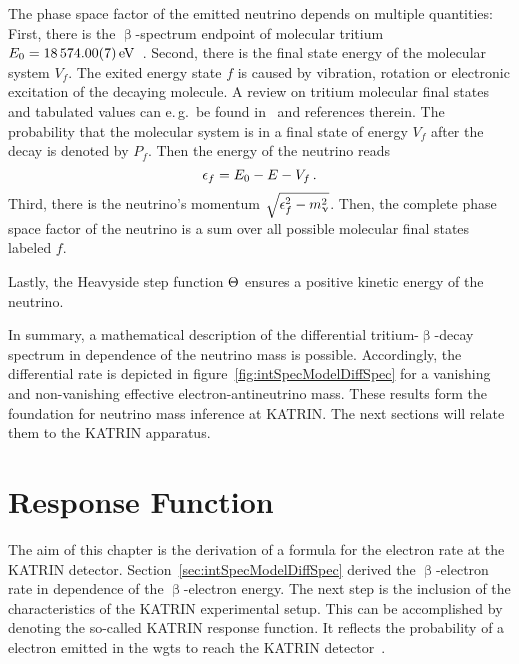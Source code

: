 The phase space factor of the emitted neutrino  depends on multiple quantities: First, there is the $\upbeta$-spectrum endpoint of molecular tritium $E_0=\SI{18574.00\pm0.07}{eV}$~\cite{Myers2015,Otten:2008zz}. Second, there is the final state energy of the molecular system $V_f$. The exited energy state $f$ is caused by vibration, rotation or electronic excitation of the decaying molecule. A review on tritium molecular final states and tabulated values can e.\,g.~be found in~\cite{Bodine2015} and references therein. The probability that the molecular system is in a final state of energy $V_f$ after the decay is denoted by $P_f$. Then the energy of the neutrino reads 
\begin{equation}
\label{eq:intSpecModelDiffSpecNeutrinoEnergy}
\epsilon_f = E_0 - E - V_f 
\text{\,.}
\end{equation}
Third, there is the neutrino's momentum $\sqrt{\epsilon_f^2-m_\upnu^2}$. Then, the complete phase space factor of the neutrino is a sum over all possible molecular final states labeled $f$.

Lastly, the Heavyside step function $\Theta$ ensures a positive kinetic energy of the neutrino.

In summary, a mathematical description of the differential tritium-$\upbeta$-decay spectrum in dependence of the neutrino mass is possible. Accordingly, the differential rate is depicted in figure~\ref{fig:intSpecModelDiffSpec} for a vanishing and non-vanishing effective electron-antineutrino mass. These results form the foundation for neutrino mass inference at KATRIN. The next sections will relate them to the KATRIN apparatus.

\section{Response Function}
\label{sec:intSpecModelResponse}
The aim of this chapter is the derivation of a formula for the electron rate at the KATRIN detector. Section~\ref{sec:intSpecModelDiffSpec} derived the $\upbeta$-electron rate in dependence of the $\upbeta$-electron energy. The next step is the inclusion of the characteristics of the KATRIN experimental setup. This can be accomplished by denoting the so-called KATRIN response function. It reflects the probability of a electron emitted in the \gls{wgts} to reach the KATRIN detector~\cite{Groh2015}.


